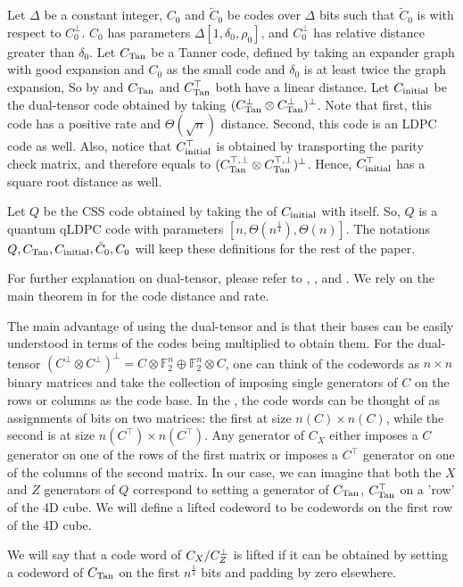 \begin{definition}
  \label{def:thecode}
  Let $\Delta$ be a constant integer, $C_{0}$ and $\tilde{C}_{0}$ be codes over $\Delta$ bits such that $\tilde{C}_{0}$ is \trig with respect to $C^{\perp}_{0}$. $C_{0}$ has parameters $\Delta[1,\delta_{0},\rho_{0}]$, and $C_{0}^\perp$ has relative distance greater than $\delta_{0}$. Let $C_{\text{Tan}}$ be a Tanner code, defined by taking an expander graph with good expansion and $C_{0}$ as the small code and $\delta_{0}$ is at least twice the graph expansion, So by \cite{ExpanderCodes} and  $C_{\text{Tan}}$ and $C_{\text{Tan}}^\top$ both have a linear distance. Let $C_{\text{initial}}$ be the dual-tensor code obtained by taking $(C_{\text{Tan}}^\perp \otimes C_{\text{Tan}}^\perp )^\perp$. Note that first, this code has a positive rate and $\Theta(\sqrt{n})$ distance. Second, this code is an LDPC code as well. Also, notice that $C_{\text{initial}}^{\top}$ is obtained by transporting the parity check matrix, and therefore equals to $(C_{\text{Tan}}^{\top, \perp} \otimes C_{\text{Tan}}^{\top, \perp} )^\perp$. Hence, $C_{\text{initial}}^{\top}$ has a square root distance as well.

Let $Q$ be the CSS code obtained by taking the \Hyp of $C_{\text{initial}}$ with itself. So, $Q$ is a quantum qLDPC code with parameters $[n, \Theta(n^{\frac{1}{4}}), \Theta(n)]$. The notations $Q,C_{\text{Tan}}, C_{\text{initial}}, \tilde{C}_{0}, C_{0}$ will keep these definitions for the rest of the paper.
\end{definition}
For further explanation on dual-tensor, please refer to \cite{leverrier2022quantum}, \cite{Dinur}, and \cite{Pavel}. We rely on the main theorem in \cite{Tillich_2014} for the \Hyp code distance and rate.

The main advantage of using the dual-tensor and \Hyp is that their bases can be easily understood in terms of the codes being multiplied to obtain them. For the dual-tensor $(C^{\perp}\otimes C^{\perp})^{\perp} = C\otimes \mathbb{F}_{2}^{n} \oplus \mathbb{F}_{2}^{n} \otimes C$, one can think of the codewords as $n\times n$ binary matrices and take the collection of imposing single generators of $C$ on the rows or columns as the code base. In the \Hyp, the code words can be thought of as assignments of bits on two matrices: the first at size $n(C) \times n(C)$, while the second is at size $n(C^\top) \times n(C^\top)$. Any generator of $C_{X}$ either imposes a $C$ generator on one of the rows of the first matrix or imposes a $C^{\top}$ generator on one of the columns of the second matrix. In our case, we can imagine that both the $X$ and $Z$ generators of $Q$ correspond to setting a generator of $C_{\text{Tan}}$, $C_{\text{Tan}}^\top$ on a 'row' of the 4D cube. We will define a lifted codeword to be codewords on the first row of the 4D cube.
\begin{definition}
  \label{def:lifted}
  We will say that a code word of $C_{X}/C_{Z}^\perp$ is lifted if it can be obtained by setting a codeword of $C_{\text{Tan}}$ on the first $n^{\frac{1}{4}}$ bits and padding by zero elsewhere. 
\end{definition}


